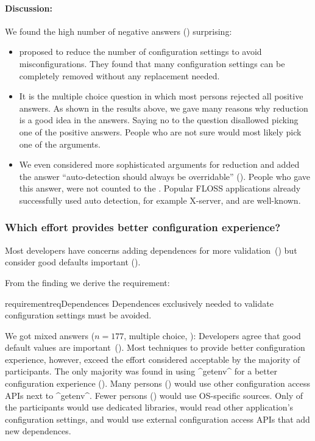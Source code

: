 \paragraph{Discussion:}
We found the high number of negative answers () surprising:
\begin{itemize}
\item
\citet{xu2015hey} proposed to reduce the number of configuration settings to avoid misconfigurations.
They found that many configuration settings can be completely removed without any replacement needed.
\item
It is the multiple choice question in which most persons rejected all positive answers.
As shown in the results above, we gave many reasons why reduction is a good idea in the answers.
Saying no to the question disallowed picking one of the positive answers.
People who are not sure would most likely pick one of the arguments.
\item
We even considered more sophisticated arguments for reduction and added the answer ``auto-detection should always be overridable'' ().
People who gave this answer, were not counted to the .
Popular FLOSS applications already successfully used auto detection, for example X-server, and are well-known.
\end{itemize}



\subsubsection{Which effort provides better configuration experience?}

\begin{finding}
Most developers have concerns adding dependences for more validation~() but consider good defaults important ().
\end{finding}

From the finding we derive the requirement:

\begin{restatable}{requirement}{reqDependences}
\label{req:dependences}
Dependences exclusively needed to validate configuration settings must be avoided.
\end{restatable}



\methodQuestion{}
We got mixed answers ($n=177$, multiple choice, ):
Developers agree that good default values are important~().
Most techniques to provide better configuration experience, however, exceed the effort considered acceptable by the majority of participants.
The only majority was found in using ^getenv^ for a better configuration experience ().
Many persons () would use other configuration access APIs next to ^getenv^.
Fewer persons () would use OS-specific sources.
Only  of the participants would use dedicated libraries,  would read other application's configuration settings, and  would use external configuration access APIs that add new dependences.

